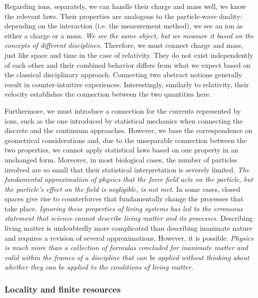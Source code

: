 Regarding ions,  separately, we can handle their charge and mass well, we know the relevant laws.
Their properties are analogous to the particle-wave duality: depending on the interaction (i.e. the measurement method), we see an ion as either a charge or a mass.
\textit{We see the same object, but we measure it based on the concepts of different disciplines.}
Therefore, we must connect charge and mass, just like space and time in the case of relativity.
They do not exist independently of each other and their combined behavior differs from what we expect based on the classical disciplinary approach.
Connecting two abstract notions generally result in counter-intuitive experiences.
Interestingly, similarly to relativity, their velocity establishes the connection between the two quantities here.

Furthermore, we must introduce a connection for the currents represented by ions, such as the one introduced by statistical mechanics when connecting the discrete and the continuum approaches.
However, we base the correspondence on geometrical considerations and, due to the unseparable connection between the two properties, we cannot apply statistical laws based on one property in an unchanged form.
Moreover, in most biological cases, the number of particles involved are so small that their statistical interpretation is severely limited.
\textit{The fundamental approximation of physics that the force field acts on the particle, but the particle's effect on the field is negligible, is not met.}
In some cases, closed spaces give rise to counterforces that fundamentally change the processes that take place.
\textit{Ignoring these properties of living systems has led to the erroneous statement that science cannot describe living matter and its processes.}
Describing living matter is undoubtedly more complicated than describing inanimate nature and requires a revision of several approximations. However, it is possible.
\textit{Physics is much more than a collection of formulas concluded
for inanimate matter and valid within the frames of a discipline
that
can be applied without thinking about whether they can be applied 
to the conditions of living matter.}



\subsubsection{Locality and finite resources\label{sec:Physics-Resources}}


